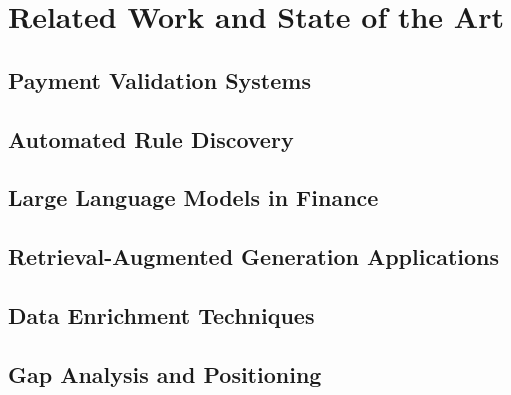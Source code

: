 \chapter{Related Work and State of the Art}
\label{ch:related-work}

\section{Payment Validation Systems}
\label{sec:payment-validation-systems}


\section{Automated Rule Discovery}
\label{sec:automated-rule-discovery}


\section{Large Language Models in Finance}
\label{sec:llms-finance}


\section{Retrieval-Augmented Generation Applications}
\label{sec:rag-applications}


\section{Data Enrichment Techniques}
\label{sec:data-enrichment-techniques}


\section{Gap Analysis and Positioning}
\label{sec:gap-analysis}

